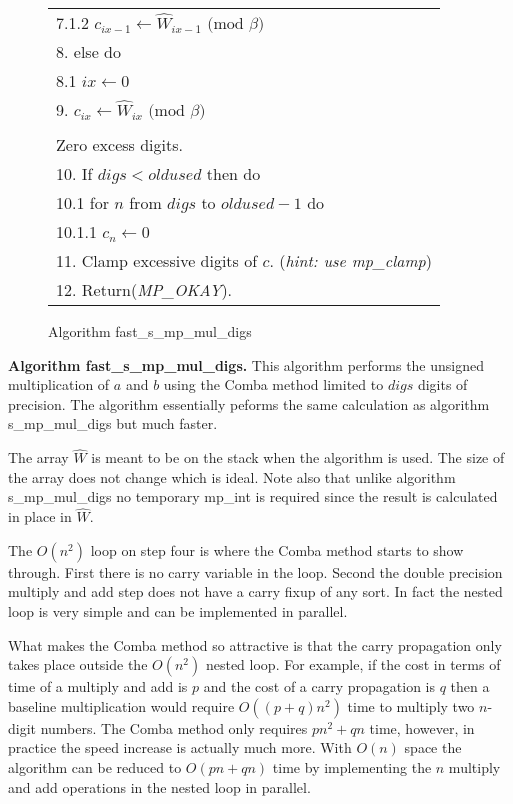 \documentclass[b5paper]{book}
\begin{document}
\begin{figure}[!here]
\begin{small}
\begin{center}
\begin{tabular}{l}
\hspace{6mm}7.1.2  $c_{ix - 1} \leftarrow \hat W_{ix - 1} \mbox{ (mod }\beta\mbox{)}$ \\
8.  else do \\
\hspace{3mm}8.1  $ix \leftarrow 0$ \\
9.  $c_{ix} \leftarrow \hat W_{ix} \mbox{ (mod }\beta\mbox{)}$ \\
\\
Zero excess digits. \\
10.  If $digs < oldused$ then do \\
\hspace{3mm}10.1  for $n$ from $digs$ to $oldused - 1$ do \\
\hspace{6mm}10.1.1  $c_n \leftarrow 0$ \\
11.  Clamp excessive digits of $c$.  (\textit{hint: use mp\_clamp}) \\
12.  Return(\textit{MP\_OKAY}). \\
\hline
\end{tabular}
\end{center}
\end{small}
\caption{Algorithm fast\_s\_mp\_mul\_digs}
\end{figure}

\textbf{Algorithm fast\_s\_mp\_mul\_digs.}
This algorithm performs the unsigned multiplication of $a$ and $b$ using the Comba method limited to $digs$ digits of precision.  The algorithm
essentially peforms the same calculation as algorithm s\_mp\_mul\_digs but much faster.

The array $\hat W$ is meant to be on the stack when the algorithm is used.  The size of the array does not change which is ideal.  Note also that 
unlike algorithm s\_mp\_mul\_digs no temporary mp\_int is required since the result is calculated in place in $\hat W$.  

The $O(n^2)$ loop on step four is where the Comba method starts to show through.  First there is no carry variable in the loop.  Second the
double precision multiply and add step does not have a carry fixup of any sort.  In fact the nested loop is very simple and can be implemented
in parallel.  

What makes the Comba method so attractive is that the carry propagation only takes place outside the $O(n^2)$ nested loop.  For example, if the 
cost in terms of time of a multiply and add is $p$ and the cost of a carry propagation is $q$ then a baseline multiplication would require 
$O \left ((p + q)n^2 \right )$ time to multiply two $n$-digit numbers.  The Comba method only requires $pn^2 + qn$ time, however, in practice 
the speed increase is actually much more.  With $O(n)$ space the algorithm can be reduced to $O(pn + qn)$ time by implementing the $n$ multiply
and add operations in the nested loop in parallel.  
\end{document}
